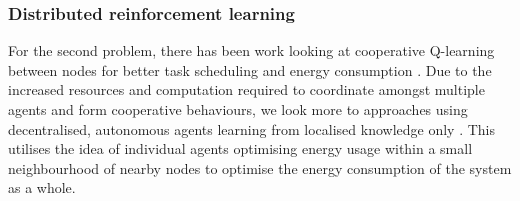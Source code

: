 \subsubsection{Distributed reinforcement learning}
For the second problem, there has been work looking at cooperative Q-learning between nodes for better task scheduling and energy consumption \citep{doi:10.1155/2014/765182}. Due to the increased resources and computation required to coordinate amongst multiple agents and form cooperative behaviours, we look more to approaches using decentralised, autonomous agents learning from localised knowledge only \citep{10.1007/978-3-642-11814-2_4}.  This utilises the idea of individual agents optimising energy usage within a small neighbourhood of nearby nodes to optimise the energy consumption of the system as a whole. 

